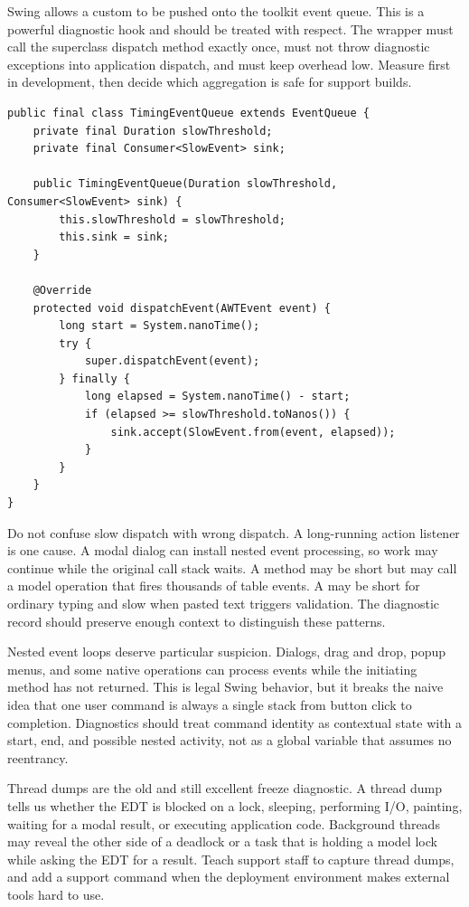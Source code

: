 Swing allows a custom  to be pushed onto the toolkit event queue. This is a powerful diagnostic hook and should be treated with respect. The wrapper must call the superclass dispatch method exactly once, must not throw diagnostic exceptions into application dispatch, and must keep overhead low. Measure first in development, then decide which aggregation is safe for support builds.

\begin{lstlisting}[caption={Measuring slow event dispatch without logging every event.}]
public final class TimingEventQueue extends EventQueue {
    private final Duration slowThreshold;
    private final Consumer<SlowEvent> sink;

    public TimingEventQueue(Duration slowThreshold, Consumer<SlowEvent> sink) {
        this.slowThreshold = slowThreshold;
        this.sink = sink;
    }

    @Override
    protected void dispatchEvent(AWTEvent event) {
        long start = System.nanoTime();
        try {
            super.dispatchEvent(event);
        } finally {
            long elapsed = System.nanoTime() - start;
            if (elapsed >= slowThreshold.toNanos()) {
                sink.accept(SlowEvent.from(event, elapsed));
            }
        }
    }
}
\end{lstlisting}

Do not confuse slow dispatch with wrong dispatch. A long-running action listener is one cause. A modal dialog can install nested event processing, so work may continue while the original call stack waits. A  method may be short but may call a model operation that fires thousands of table events. A  may be short for ordinary typing and slow when pasted text triggers validation. The diagnostic record should preserve enough context to distinguish these patterns.

Nested event loops deserve particular suspicion. Dialogs, drag and drop, popup menus, and some native operations can process events while the initiating method has not returned. This is legal Swing behavior, but it breaks the naive idea that one user command is always a single stack from button click to completion. Diagnostics should treat command identity as contextual state with a start, end, and possible nested activity, not as a global variable that assumes no reentrancy.

Thread dumps are the old and still excellent freeze diagnostic. A thread dump tells us whether the EDT is blocked on a lock, sleeping, performing I/O, painting, waiting for a modal result, or executing application code. Background threads may reveal the other side of a deadlock or a task that is holding a model lock while asking the EDT for a result. Teach support staff to capture thread dumps, and add a support command when the deployment environment makes external tools hard to use.

